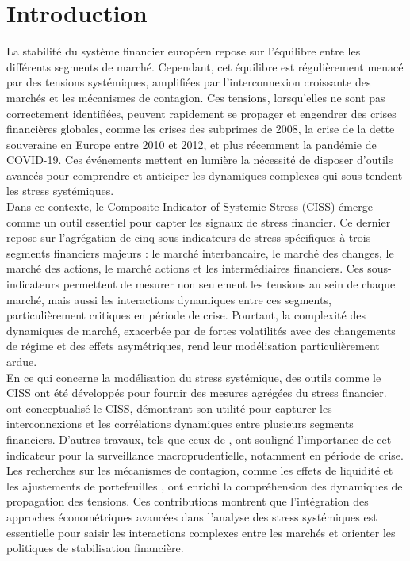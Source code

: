 \section*{Introduction}

\begin{sloppypar}

La stabilité du système financier européen repose sur l’équilibre entre les différents segments de marché. Cependant, cet équilibre est régulièrement menacé par des tensions systémiques, amplifiées par l’interconnexion croissante des marchés et les mécanismes de contagion. Ces tensions, lorsqu’elles ne sont pas correctement identifiées, peuvent rapidement se propager et engendrer des crises financières globales, comme les crises des subprimes de 2008, la crise de la dette souveraine en Europe entre 2010 et 2012, et plus récemment la pandémie de COVID-19. Ces événements mettent en lumière la nécessité de disposer d’outils avancés pour comprendre et anticiper les dynamiques complexes qui sous-tendent les stress systémiques.\\

Dans ce contexte, le Composite Indicator of Systemic Stress (CISS) émerge comme un outil essentiel pour capter les signaux de stress financier. Ce dernier repose sur l’agrégation de cinq sous-indicateurs de stress spécifiques à trois segments financiers majeurs : le marché interbancaire, le marché des changes, le marché des actions, le marché actions et les intermédiaires financiers. Ces sous-indicateurs permettent de mesurer non seulement les tensions au sein de chaque marché, mais aussi les interactions dynamiques entre ces segments, particulièrement critiques en période de crise. Pourtant, la complexité des dynamiques de marché, exacerbée par de fortes volatilités avec des changements de régime et des effets asymétriques, rend leur modélisation particulièrement ardue.\\

En ce qui concerne la modélisation du stress systémique, des outils comme le CISS ont été développés pour fournir des mesures agrégées du stress financier. \cite[2012]{Hollo} ont conceptualisé le CISS, démontrant son utilité pour capturer les interconnexions et les corrélations dynamiques entre plusieurs segments financiers. D’autres travaux, tels que ceux de \cite[2013]{Duca et Peltonen}, ont souligné l’importance de cet indicateur pour la surveillance macroprudentielle, notamment en période de crise. Les recherches sur les mécanismes de contagion, comme les effets de liquidité et les ajustements de portefeuilles  \cite[2009]{Brunnermeier et Pedersen}, ont enrichi la compréhension des dynamiques de propagation des tensions. Ces contributions montrent que l’intégration des approches économétriques avancées dans l’analyse des stress systémiques est essentielle pour saisir les interactions complexes entre les marchés et orienter les politiques de stabilisation financière.\\


\end{sloppypar}

